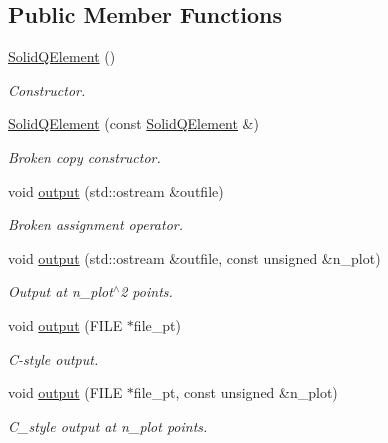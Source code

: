 \subsection*{Public Member Functions}
\begin{DoxyCompactItemize}
\item 
\hyperlink{classoomph_1_1SolidQElement_3_013_00_01NNODE__1D_01_4_a900c735691c53d5b53506cb0f095d5d6}{Solid\+Q\+Element} ()
\begin{DoxyCompactList}\small\item\em Constructor. \end{DoxyCompactList}\item 
\hyperlink{classoomph_1_1SolidQElement_3_013_00_01NNODE__1D_01_4_a302276129488b7607c1d40ce77b9b64a}{Solid\+Q\+Element} (const \hyperlink{classoomph_1_1SolidQElement}{Solid\+Q\+Element} \&)
\begin{DoxyCompactList}\small\item\em Broken copy constructor. \end{DoxyCompactList}\item 
void \hyperlink{classoomph_1_1SolidQElement_3_013_00_01NNODE__1D_01_4_a50bd6f3e7c5801a12428198b91e1ef01}{output} (std\+::ostream \&outfile)
\begin{DoxyCompactList}\small\item\em Broken assignment operator. \end{DoxyCompactList}\item 
void \hyperlink{classoomph_1_1SolidQElement_3_013_00_01NNODE__1D_01_4_ac3ad47275d4cf27cd0ec0b7ec1c1f369}{output} (std\+::ostream \&outfile, const unsigned \&n\+\_\+plot)
\begin{DoxyCompactList}\small\item\em Output at n\+\_\+plot$^\wedge$2 points. \end{DoxyCompactList}\item 
void \hyperlink{classoomph_1_1SolidQElement_3_013_00_01NNODE__1D_01_4_aa31ca4d1e3f97ba0a062141707d7aaf3}{output} (F\+I\+LE $\ast$file\+\_\+pt)
\begin{DoxyCompactList}\small\item\em C-\/style output. \end{DoxyCompactList}\item 
void \hyperlink{classoomph_1_1SolidQElement_3_013_00_01NNODE__1D_01_4_a0de774d3e5a65e11b485d25f57e7f3a1}{output} (F\+I\+LE $\ast$file\+\_\+pt, const unsigned \&n\+\_\+plot)
\begin{DoxyCompactList}\small\item\em C\+\_\+style output at n\+\_\+plot points. \end{DoxyCompactList}\item 

\end{DoxyCompactItemize}
